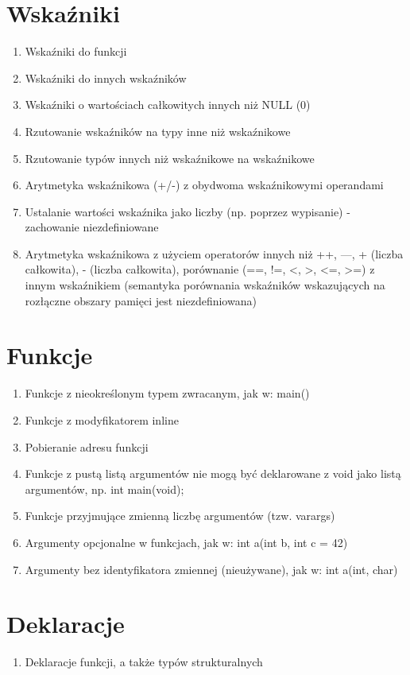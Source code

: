 \documentclass[a4paper,twoside,openright,11pt]{report}
\begin{document}
  \section {Wskaźniki}
    \begin{enumerate}
      \item Wskaźniki do funkcji
      \item Wskaźniki do innych wskaźników
      \item Wskaźniki o wartościach całkowitych innych niż NULL (0)
      \item Rzutowanie wskaźników na typy inne niż wskaźnikowe
      \item Rzutowanie typów innych niż wskaźnikowe na wskaźnikowe
      \item Arytmetyka wskaźnikowa (+/-) z obydwoma wskaźnikowymi operandami
      \item Ustalanie wartości wskaźnika jako liczby (np. poprzez wypisanie) - zachowanie niezdefiniowane
      \item Arytmetyka wskaźnikowa z użyciem operatorów innych niż ++, —, + (liczba całkowita), - (liczba całkowita), porównanie (==, !=, <, >, <=, >=) z innym wskaźnikiem (semantyka porównania wskaźników wskazujących na rozłączne obszary pamięci jest niezdefiniowana)
    \end{enumerate}
  \section {Funkcje}
    \begin{enumerate}
      \item Funkcje z nieokreślonym typem zwracanym, jak w: main() { }
      \item Funkcje z modyfikatorem inline
      \item Pobieranie adresu funkcji
      \item Funkcje z pustą listą argumentów nie mogą być deklarowane z void jako listą argumentów, np. int main(void);
      \item Funkcje przyjmujące zmienną liczbę argumentów (tzw. varargs)
      \item Argumenty opcjonalne w funkcjach, jak w: int a(int b, int c = 42) { }
      \item Argumenty bez identyfikatora zmiennej (nieużywane), jak w: int a(int, char) { }
    \end{enumerate}
  \section {Deklaracje}
    \begin{enumerate}
      \item Deklaracje funkcji, a także typów strukturalnych 
    \end{enumerate}
\end{document}
